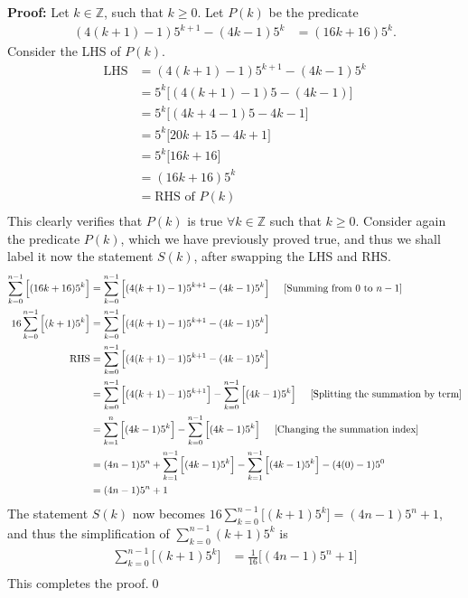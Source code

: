 \documentclass[a4paper,11pt]{article}
\newcommand{\ds}{\displaystyle}
\begin{document}
\begin{enumerate}[leftmargin=*]
		\textbf{Proof:} Let $\ds{k \in \mathbb{Z}}$, such that $\ds{k \geq 0}$. Let $\ds{P(k)}$ be the predicate 
		\begin{align*}
			(4(k+1)-1)5^{k+1}-(4k-1)5^k & = (16k+16)5^k.
		\end{align*}
		Consider the LHS of $\ds{P(k)}$.
		\begin{align*}
			\text{LHS} & = (4(k+1)-1)5^{k+1}-(4k-1)5^k\\
					   & = 5^k \big[(4(k+1)-1)5-(4k-1)\big]\\
					   & = 5^k \big[(4k+4-1)5-4k-1\big]\\
					   & = 5^k \big[20k+15-4k+1\big]\\
					   & = 5^k \big[16k+16\big]\\
					   & = (16k+16)5^k\\
					   & = \text{RHS of } P(k)\\
		\end{align*}
		This clearly verifies that $\ds{P(k)}$ is true $\ds{\forall k \in \mathbb{Z}}$ such that $\ds{k \geq 0}$.
		\bigbreak
		Consider again the predicate $\ds{P(k)}$, which we have previously proved true, and thus we shall label it now the statement $\ds{S(k)}$, after swapping the LHS and RHS. 
		\begin{align*}
			\sum_{k=0}^{n-1}\Big[(16k+16)5^k\Big] & = \sum_{k=0}^{n-1} \Big[(4(k+1)-1)5^{k+1}-(4k-1)5^k\Big] \hspace{5mm} \text{[Summing from $\ds{0}$ to $\ds{n-1}$]}\\
			16\sum_{k=0}^{n-1}\Big[(k+1)5^k\Big] & = \sum_{k=0}^{n-1} \Big[(4(k+1)-1)5^{k+1}-(4k-1)5^k\Big]\\
			\text{RHS} & = \sum_{k=0}^{n-1} \Big[(4(k+1)-1)5^{k+1}-(4k-1)5^k\Big]\\
					   & = \sum_{k=0}^{n-1} \Big[(4(k+1)-1)5^{k+1}\Big] - \sum_{k=0}^{n-1}\Big[(4k-1)5^k\Big] \hspace{5mm} \text{[Splitting the summation by term]}\\
					   & = \sum_{k=1}^{n} \Big[(4k-1)5^{k}\Big] - \sum_{k=0}^{n-1}\Big[(4k-1)5^k\Big] \hspace{5mm} \text{[Changing the summation index]}\\
					   & = (4n-1)5^{n} + \sum_{k=1}^{n-1} \Big[(4k-1)5^{k}\Big] - \sum_{k=1}^{n-1}\Big[(4k-1)5^k\Big] - (4(0)-1)5^{0}\\
					   & = (4n-1)5^{n} + 1\\
		\end{align*}
		The statement $\ds{S(k)}$ now becomes $\ds{16\sum_{k=0}^{n-1}\Big[(k+1)5^k\Big] = (4n-1)5^{n} + 1}$, and thus the simplification of $\ds{\sum^{n-1}_{k=0} (k+1)5^k}$ is 
		\begin{align*}
			\sum_{k=0}^{n-1}\Big[(k+1)5^k\Big] & = \frac{1}{16}\Big[(4n-1)5^{n} + 1\Big]\\
		\end{align*}
		This completes the proof.\qed




\end{enumerate}
\end{document}
